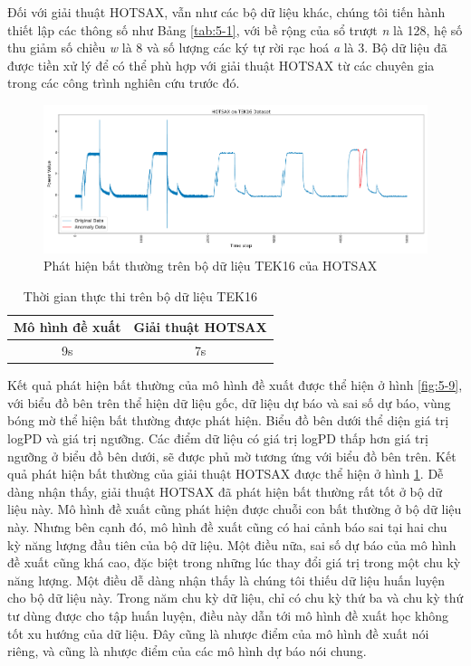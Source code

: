 Đối với giải thuật HOTSAX, vẫn như các bộ dữ liệu khác, chúng tôi tiến hành thiết lập các thông số như Bảng \ref{tab:5-1}, với bề rộng của sổ trượt \textit{n} là 128, hệ số thu giảm số chiều \textit{w} là 8 và số lượng các ký tự rời rạc hoá \textit{a} là 3. Bộ dữ liệu đã được tiền xử lý để có thể phù hợp với giải thuật HOTSAX từ các chuyên gia trong các công trình nghiên cứu trước đó.

\begin{figure}[H]
    \centering
    \includegraphics[scale=0.75]{./content/images/5-10.png}
    \caption{Phát hiện bất thường trên bộ dữ liệu TEK16 của HOTSAX}
    \label{fig:5-10}
\end{figure}

\begin{table}[H]
\centering
\begin{tabular}{|c|c|}
\hline
\textbf{Mô hình đề xuất} & \textbf{Giải thuật HOTSAX}  \\
\hline
9s                       & 7s                     \\
\hline
\end{tabular}
\caption{Thời gian thực thi trên bộ dữ liệu TEK16}
\label{tab:5-5}
\end{table}

Kết quả phát hiện bất thường của mô hình đề xuất được thể hiện ở hình \ref{fig:5-9}, với biểu đồ bên trên thể hiện dữ liệu gốc, dữ liệu dự báo và sai số dự báo, vùng bóng mờ thể hiện bất thường được phát hiện. Biểu đồ bên dưới thể diện giá trị logPD và giá trị ngưỡng. Các điểm dữ liệu có giá trị logPD thấp hơn giá trị ngưỡng ở biểu đồ bên dưới, sẽ được phủ mờ tương ứng với biểu đồ bên trên. Kết quả phát hiện bất thường của giải thuật HOTSAX được thể hiện ở hình \ref{fig:5-10}. Dễ dàng nhận thấy, giải thuật HOTSAX đã phát hiện bất thường rất tốt ở bộ dữ liệu này. Mô hình đề xuất cũng phát hiện được chuỗi con bất thường ở bộ dữ liệu này. Nhưng bên cạnh đó, mô hình đề xuất cũng có hai cảnh báo sai tại hai chu kỳ năng lượng đầu tiên của bộ dữ liệu. Một điều nữa, sai số dự báo của mô hình đề xuất cũng khá cao, đặc biệt trong những lúc thay đổi giá trị trong một chu kỳ năng lượng. Một điều dễ dàng nhận thấy là chúng tôi thiếu dữ liệu huấn luyện cho bộ dữ liệu này. Trong năm chu kỳ dữ liệu, chỉ có chu kỳ thứ ba và chu kỳ thứ tư dùng được cho tập huấn luyện, điều này dẫn tới mô hình đề xuất học không tốt xu hướng của dữ liệu. Đây cũng là nhược điểm của mô hình đề xuất nói riêng, và cũng là nhược điểm của các mô hình dự báo nói chung.

